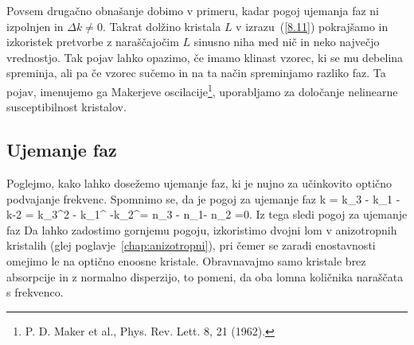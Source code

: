 Povsem drugačno obnašanje dobimo v primeru, kadar pogoj ujemanja faz ni izpolnjen in 
 $\Delta k \neq 0$. Takrat dolžino kristala $L$ v izrazu~(\ref{8.11})
pokrajšamo in izkoristek pretvorbe z naraščajočim
$L$ sinusno niha med nič in neko največjo vrednostjo. Tak pojav lahko opazimo, če
imamo klinast vzorec, ki se mu debelina spreminja, ali pa če vzorec sučemo 
in na ta način spreminjamo razliko faz. Ta pojav, imenujemo ga Makerjeve 
oscilacije\footnote{P. D. Maker et al., Phys. Rev. Lett. 8, 21 (1962).}, 
uporabljamo za določanje nelinearne susceptibilnost kristalov.


\subsection*{Ujemanje faz}
Poglejmo, kako lahko dosežemo ujemanje faz, ki je nujno za učinkovito optično
podvajanje frekvenc. Spomnimo se, da je pogoj za ujemanje faz 
\beq
\Delta k = k_3 - k_1 -k-2 = k_3^{2\omega} - k_1^{\omega} -k_2^\omega = 
 n_3 -  n_1-  n_2 =0.
\eeq
Iz tega sledi pogoj za ujemanje faz
Da lahko zadostimo gornjemu pogoju, izkoristimo dvojni lom v anizotropnih kristalih
(glej poglavje~\ref{chap:anizotropni}), pri čemer se zaradi enostavnosti omejimo le na optično 
enoosne kristale. Obravnavajmo samo kristale brez absorpcije in z normalno disperzijo, 
to pomeni, da oba lomna količnika naraščata s frekvenco.  

